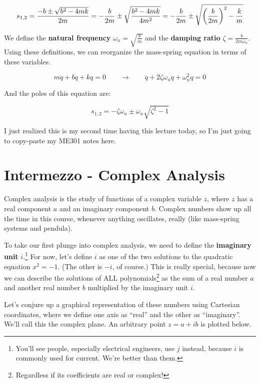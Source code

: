 \documentclass{report}
\begin{document}
\begin{onehalfspacing}
\begin{flushleft}
\[s_{1, 2} = \frac{-b \pm \sqrt{b^2 - 4mk}}{2m} = -\frac{b}{2m} \pm \sqrt{\frac{b^2 - 4mk}{4m^2}} = -\frac{b}{2m} \pm \sqrt{\qty(\frac{b}{2m})^2 - \frac{k}{m}}\]

We define the \textbf{natural frequency} \(\omega_n = \sqrt{\frac{k}{m}}\) and the \textbf{damping ratio} \(\zeta = \frac{b}{2m\omega_n}\). Using these definitions, we can reorganize the mass-spring equation in terms of these variables.

\vspace{-0.1in}
\[m\ddot{q} + b\dot{q} + kq = 0 \qquad \to \qquad \ddot{q} + 2\zeta\omega_n \dot{q} + \omega_n^2 q = 0\]

And the poles of this equation are:

\[s_{1, 2} = -\zeta \omega_n \pm \omega_n \sqrt{\zeta^2 - 1}\]

I just realized this is my second time having this lecture today, so I'm just going to copy-paste my ME301 notes here.

\section{Intermezzo - Complex Analysis}

Complex analysis is the study of functions of a complex variable \(z\), where \(z\) has a real component \(a\) and an imaginary component \(b\). Complex numbers show up all the time in this course, whenever anything oscillates, really (like mass-spring systems and pendula).

\medskip

To take our first plunge into complex analysis, we need to define the \textbf{imaginary unit} \(i\).\footnote{You'll see people, especially electrical engineers, use \(j\) instead, because \(i\) is commonly used for current. We're better than them.} For now, let's define \(i\) as one of the two solutions to the quadratic equation \(x^2 = -1\). (The other is \(-i\), of course.) This is really special, because now we can describe the solutions of ALL polynomials\footnote{Regardless if its coefficients are real or complex!} as the sum of a real number \(a\) and another real number \(b\) multiplied by the imaginary unit \(i\).

\medskip

Let's conjure up a graphical representation of these numbers using Cartesian coordinates, where we define one axis as ``real'' and the other as ``imaginary''. We'll call this the complex plane. An arbitrary point \(z = a+ ib\) is plotted below.


\end{flushleft}
\end{onehalfspacing}
\end{document}
